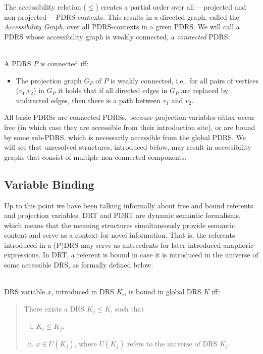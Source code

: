 The accessibility relation ($\leq$) creates a partial order over all
---projected and non-projected--- PDRS-contexts. This results in a directed
graph, called the \textit{Accessibility Graph}, over all PDRS-contexts in
a given PDRS. We will call a PDRS whose accessibility graph is weakly
connected, a \emph{connected} PDRS:

\begin{definition}[Connectedness]~\\
  A PDRS $P$ is connected iff:
  \begin{itemize}
    \item The projection graph $G_P$ of $P$ is weakly connected, i.e., for
      all pairs of vertices ($v_1$,$v_2$) in $G_P$ it holds that if all
      directed edges in $G_P$ are replaced by undirected edges, then there is
      a path between $v_1$ and $v_2$.  
  \end{itemize}
\end{definition}

\noindent All basic PDRSs are connected PDRSs, because projection variables
either occur free (in which case they are accessible from their introduction
site), or are bound by some sub-PDRS, which is necessarily accessible from
the global PDRS. We will see that unresolved structures, introduced below,
may result in accessibility graphs that consist of multiple non-connected
components.


\subsection{Variable Binding}

Up to this point we have been talking informally about free and bound
referents and projection variables. DRT and PDRT are dynamic semantic
formalisms, which means that the meaning structures simultaneously provide
semantic content and serve as a context for novel information. That is, the
referents introduced in a (P)DRS may serve as antecedents for later
introduced anaphoric expressions. In DRT, a referent is bound in case it is
introduced in the universe of some accessible DRS, as formally defined below.

\begin{definition}~\\
DRS variable $x$, introduced in DRS $K_i$, is bound in global DRS $K$ iff:
\begin{quote}
There exists a DRS $K_j \leq K$, such that
\begin{enumerate}[i.]
  \item $K_i \leq K_j$;
  \item $x\in U(K_j)$, where $U(K_j)$ refers to the universe of DRS $K_j$.
\end{enumerate}
\end{quote}
\end{definition}

